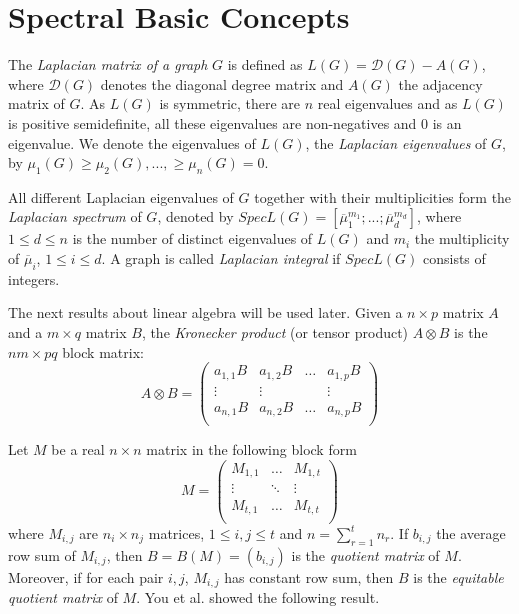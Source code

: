 \documentclass[preprint,12pt]{elsarticle}
\begin{document}
\section{Spectral Basic Concepts}

The {\it Laplacian matrix of a graph} $G$ is defined as $L(G) = {\mathcal D}(G) - A(G)$, where ${\mathcal D}(G)$ 
denotes the diagonal degree matrix and $A(G)$ the adjacency matrix of $G$. 
As $L(G)$ is symmetric, there are $n$ real eigenvalues and as $L(G)$ is positive semidefinite, all these eigenvalues are non-negatives and 0 is an eigenvalue. We denote the eigenvalues of $L(G)$, the {\it Laplacian eigenvalues} of $G$, by $\mu_1(G) \geq \mu_2(G), ..., \geq \mu_n(G) =0$.

All different Laplacian eigenvalues of $G$ together with their multiplicities form the {\it Laplacian spectrum} of $G$, denoted by $SpecL(G) = [ \overline{\mu}_1^{m_1}; ...; \overline{\mu}_d^{m_d}]$, where  $1 \leq d \leq n$ is the number of distinct eigenvalues of $L(G)$ and $m_i$ the multiplicity of $\overline{\mu}_i$, $1 \leq i \leq d$.  
A graph is called {\it Laplacian integral} if $SpecL(G)$ consists of integers. 

The next results about linear algebra will be used later. 
Given a $n \times p$ matrix $A$ and a $m \times q$ matrix $B$, the 
{\it Kronecker product} (or tensor product) $A \otimes  B$ is the $nm \times pq$ block matrix:
$$ A \otimes  B =
    \begin{pmatrix}
   a_{1,1}B & a_{1,2}B & \dots & a_{1,p}B \\
     \vdots              &   \vdots              &              & \vdots \\
    a_{n,1}B & a_{n,2}B & \dots & a_{n,p}B \\
    \end{pmatrix}
    $$

Let $M$ be a real  $n \times n$ matrix in the following block form 
$$ M =
    \begin{pmatrix}
   M_{1,1} & \dots    & M_{1,t} \\
    \vdots   &  \ddots     & \vdots \\
    M_{t,1} & \dots       & M_{t,t} \\
    \end{pmatrix}
    $$
where $M_{i,j}$ are $n_i \times n_j$ matrices, $1 \leq i,j \leq t$ and $n=\sum_{r=1}^{t} n_r$. If $b_{i,j}$
 the average row sum of $M_{i,j}$, then $B = B(M) = (b_{i,j})$ is the {\it quotient matrix} of $M$. 
Moreover, if for each pair $i,j$, $M_{i,j}$ has constant row sum, then $B$ is the {\it equitable quotient matrix} of $M$. 
You et al. \cite{YYSX19} showed the following result.
\end{document}
